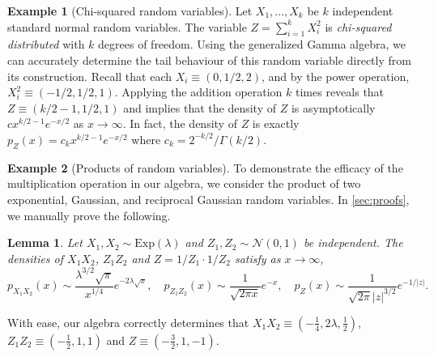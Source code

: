 \documentclass{article}
\newtheorem{lemma}[theorem]{Lemma}
\theoremstyle{definition}
\newtheorem{example}{Example}
\newcommand{\dd}{\mathrm{d}}
\begin{document}
\begin{example}[Chi-squared random variables]
	Let $X_1,\dots,X_k$ be $k$ independent standard normal random variables. The variable $Z = \sum_{i=1}^k X_i^2$ is \emph{chi-squared distributed} with $k$ degrees of freedom. Using the generalized Gamma algebra, we can accurately determine the tail behaviour of this random variable directly from its construction. Recall that each $X_i \equiv (0,1/2,2)$, and by the power operation, $X_i^2 \equiv (-1/2,1/2,1)$. Applying the addition operation $k$ times reveals that $Z \equiv (k/2-1,1/2,1)$ and implies that the density of $Z$ is asymptotically $c x^{k/2-1} e^{-x / 2}$ as $x \to \infty$. In fact, the density of $Z$ is exactly $p_Z(x) = c_k x^{k/2-1} e^{-x/2}$ where $c_k = 2^{-k/2} / \Gamma(k/2)$.
\end{example}

\begin{example}[Products of random variables]
	To demonstrate the efficacy of the multiplication operation in our algebra, we consider the product of two exponential, Gaussian, and reciprocal Gaussian random variables. In \cref{sec:proofs}, we manually prove the following.
	\begin{lemma}
	\label{lem:Products}
		Let $X_1,X_2 \sim \mbox{Exp}(\lambda)$ and $Z_1,Z_2 \sim \mathcal{N}(0,1)$ be independent. The densities of $X_1 X_2$, $Z_1 Z_2$ and $Z = 1/Z_1 \cdot 1/Z_2$ satisfy as $x \to \infty$,
		\[
			p_{X_1 X_2}(x) \sim \frac{\lambda^{3/2}\sqrt{\pi}}{x^{1/4}} e^{-2\lambda \sqrt{x}},\quad p_{Z_1 Z_2}(x) \sim \frac{1}{\sqrt{2\pi x}} e^{-x},\quad
			p_{Z}(x) \sim \frac{1}{\sqrt{2\pi}|z|^{3/2}}e^{-1/|z|}.
		\]
	\end{lemma}
	With ease, our algebra correctly determines that $X_1 X_2 \equiv (-\frac14,2\lambda,\frac12)$, $Z_1 Z_2 \equiv (-\frac12, 1, 1)$ and $Z \equiv (-\frac32,1,-1)$.
\end{example}
\end{document}
